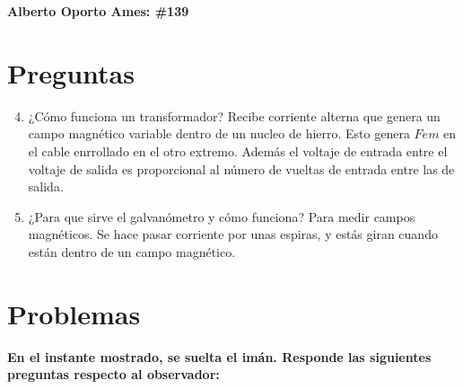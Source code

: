 \documentclass[10pt, twoside]{article}
\begin{document}
\thispagestyle{fancy}

\textbf{Alberto Oporto Ames: \#139}

\section{Preguntas}%
\label{sec:preguntas}

\begin{enumerate}
	\setcounter{enumi}{3}
	\item ¿Cómo funciona un transformador?
		\subitem Recibe corriente alterna que genera un campo magnético
			variable dentro de un nucleo de hierro.
			Esto genera $Fem$ en el cable enrrollado en el otro extremo.
			Además el voltaje de entrada entre el voltaje de salida es
			proporcional al número de vueltas de entrada entre las de salida.
	\setcounter{enumi}{4}
	\item ¿Para que sirve el galvanómetro y cómo funciona?
		\subitem Para medir campos magnéticos.
			Se hace pasar corriente por unas espiras, y estás giran cuando
			están dentro de un campo magnético.
\end{enumerate}

\section{Problemas}%
\label{sec:problemas}

\textbf{
	En el instante mostrado, se suelta el imán.
	Responde las siguientes preguntas respecto al observador:
}
\end{document}
